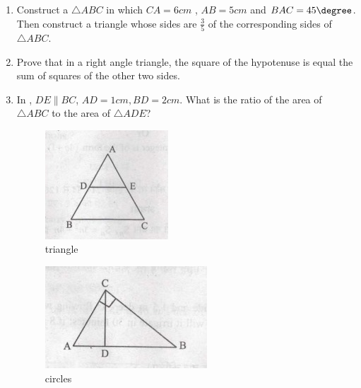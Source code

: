 \begin{enumerate}
\item Construct a $\triangle ABC$ in which $CA = 6cm$ , $AB = 5cm$ and $BAC= 45\degree$. Then  construct a triangle whose sides are $\frac{3}{5}$ of the corresponding sides of $\triangle ABC$.
\item Prove that in a right angle triangle, the square of the hypotenuse is equal the sum of squares of the other two sides.
\item In , $DE \parallel BC$, $ AD = 1 cm , BD = 2 cm$. What is the ratio of the area of $\triangle ABC$ to the area of $\triangle ADE$?
	\begin{figure}[H]
				\centering
				\includegraphics[width=\columnwidth]{figs/tri123.jpeg}
				\caption{triangle}
				\label{fig:tri35}
				
				
			\end{figure} 
	\begin{figure}[H]                                                            \centering
		                \includegraphics[width=\columnwidth]{figs/i3.jpeg}
				\caption{circles}
				\label{fig:construcion45}
		        \end{figure}
		        

\end{enumerate}
